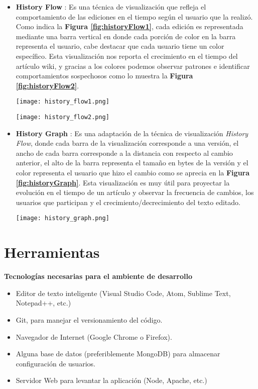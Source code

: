 \begin{itemize}
\item\textbf{History Flow} \cite{HistoryFlow}:
Es una técnica de visualización que refleja el comportamiento de las ediciones en el tiempo según el usuario que la realizó. Como indica la \textbf{Figura \ref{fig:historyFlow1}}, cada edición es representada mediante una barra vertical en donde cada porción de color en la barra representa el usuario, cabe destacar que cada usuario tiene un color específico. Esta visualización nos reporta el crecimiento en el tiempo del artículo wiki, y gracias a los colores podemos observar patrones e identificar comportamientos sospechosos como lo muestra la \textbf{Figura \ref{fig:historyFlow2}}.
\bigbreak
\begin{center}
\texttt{[image: history\_flow1.png]}
\label{fig:historyFlow1}
\end{center}
\bigbreak
\begin{center}
\texttt{[image: history\_flow2.png]}
\label{fig:historyFlow2}
\end{center}
\bigbreak
\item\textbf{History Graph} \cite{HistoryGraph}:
Es una adaptación de la técnica de visualización \textit{History Flow}, donde cada barra de la visualización corresponde a una versión, el ancho de cada barra corresponde a la distancia con respecto al cambio anterior, el alto de la barra representa el tamaño en bytes de la versión y el color representa el usuario que hizo el cambio como se aprecia en la \textbf{Figura \ref{fig:historyGraph}}. Esta visualización es muy útil para proyectar la evolución en el tiempo de un artículo y observar la frecuencia de cambios, los usuarios que participan y el crecimiento/decrecimiento del texto editado.
\bigbreak
\begin{center}
\texttt{[image: history\_graph.png]}
\label{fig:historyGraph}
\end{center}
\bigbreak
\end{itemize}

\section{Herramientas}
\textbf{Tecnologías necesarias para el ambiente de desarrollo}
\begin{itemize}
\item Editor de texto inteligente (Visual Studio Code, Atom, Sublime Text, Notepad++, etc.)
\item Git, para manejar el versionamiento del código.
\item Navegador de Internet (Google Chrome o Firefox).
\item Alguna base de datos (preferiblemente MongoDB) para almacenar configuración de usuarios.
\item Servidor Web para levantar la aplicación (Node, Apache, etc.)
\\[5pt]
\end{itemize}

